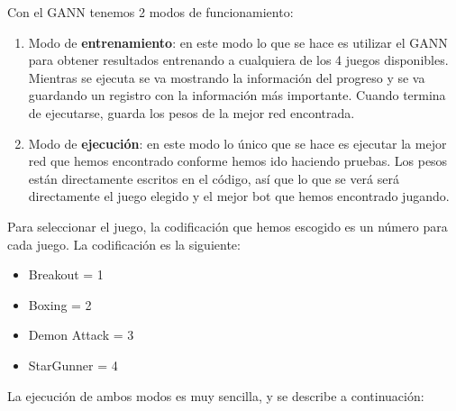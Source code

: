 Con el GANN tenemos 2 modos de funcionamiento:

\begin{enumerate}
    \item Modo de \textbf{entrenamiento}: en este modo lo que se hace es utilizar el GANN para obtener resultados entrenando a cualquiera de los 4 juegos disponibles. Mientras se ejecuta se va mostrando la información del progreso y se va guardando un registro con la información más importante. Cuando termina de ejecutarse, guarda los pesos de la mejor red encontrada.
    \item Modo de \textbf{ejecución}: en este modo lo único que se hace es ejecutar la mejor red que hemos encontrado conforme hemos ido haciendo pruebas. Los pesos están directamente escritos en el código, así que lo que se verá será directamente el juego elegido y el mejor bot que hemos encontrado jugando.
\end{enumerate}

Para seleccionar el juego, la codificación que hemos escogido es un número para cada juego. La codificación es la siguiente:

\begin{itemize}
    \item Breakout = 1
    \item Boxing = 2
    \item Demon Attack = 3
    \item StarGunner = 4
\end{itemize}

La ejecución de ambos modos es muy sencilla, y se describe a continuación:

